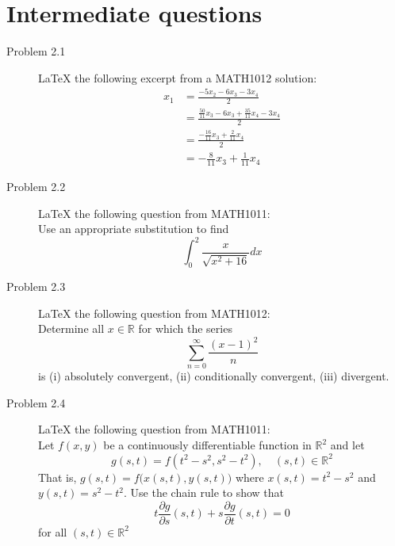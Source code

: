 \documentclass{article}
\begin{document}
\section{Intermediate questions}
\begin{description}
    \item[Problem 2.1] \LaTeX{} the following excerpt from a MATH1012 solution:\\
    \begin{align*}
        x_1&=\frac{-5x_2-6x_3-3x_4}{2}\\
        &=\frac{\frac{50}{11}x_3-6x_3+\frac{35}{11}x_4-3x_4}{2}\\
        &=\frac{-\frac{16}{11}x_3+\frac{2}{11}x_4}{2}\\
        &=-\frac{8}{11}x_3+\frac{1}{11}x_4
    \end{align*}
    \item[Problem 2.2] \LaTeX{} the following question from MATH1011:\\
    Use an appropriate substitution to find
    \[\int_0^2\frac{x}{\sqrt{x^2+16}}dx\]
    \item[Problem 2.3] \LaTeX{} the following question from MATH1012:\\
    Determine all $x\in \mathbb{R}$ for which the series
    \[\sum^\infty_{n=0}\frac{(x-1)^2}{n}\]
    is (i) absolutely convergent, (ii) conditionally convergent, (iii) divergent.
    \item[Problem 2.4] \LaTeX{} the following question from MATH1011:\\
    Let $f(x,y)$ be a continuously differentiable function in $\mathbb{R}^2$ and let\\
    \[g(s,t)=f(t^2-s^2,s^2-t^2),\quad (s,t)\in \mathbb{R}^2\]
    That is, $g(s,t)=f\big(x(s,t),y(s,t)\big)$ where $x(s,t)=t^2-s^2$ and $y(s,t)=s^2-t^2$. Use the chain rule to show that
    \[t\frac{\partial g}{\partial s}(s,t) + s\frac{\partial g}{\partial t}(s,t)=0\]
    for all $(s,t)\in \mathbb{R}^2$
\end{description}
\end{document}

